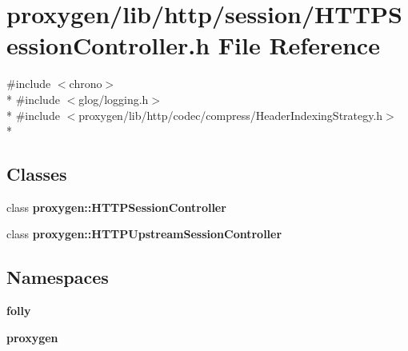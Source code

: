 \section{proxygen/lib/http/session/\+H\+T\+T\+P\+Session\+Controller.h File Reference}
\label{HTTPSessionController_8h}
{\ttfamily \#include $<$chrono$>$}\\*
{\ttfamily \#include $<$glog/logging.\+h$>$}\\*
{\ttfamily \#include $<$proxygen/lib/http/codec/compress/\+Header\+Indexing\+Strategy.\+h$>$}\\*
\subsection*{Classes}
\begin{DoxyCompactItemize}
\item 
class {\bf proxygen\+::\+H\+T\+T\+P\+Session\+Controller}
\item 
class {\bf proxygen\+::\+H\+T\+T\+P\+Upstream\+Session\+Controller}
\end{DoxyCompactItemize}
\subsection*{Namespaces}
\begin{DoxyCompactItemize}
\item 
 {\bf folly}
\item 
 {\bf proxygen}
\end{DoxyCompactItemize}

